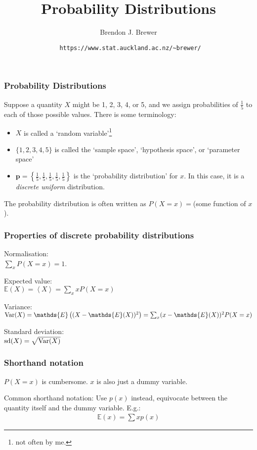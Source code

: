 \documentclass{beamer}
\title{Probability Distributions}
\author{Brendon J. Brewer}
\institute{Department of Statistics\\
The University of Auckland}
\date{{\tt \color{blue} https://www.stat.auckland.ac.nz/\~{ }brewer/}}
\begin{document}
\frame{\titlepage}


\begin{frame}
\frametitle{Probability Distributions}
Suppose a quantity $X$ might be 1, 2, 3, 4, or 5, and we assign probabilities of
$\frac{1}{5}$ to each of those possible values. There is some terminology:

\begin{itemize}
  \item $X$ is called a `random variable'\footnote{not often by me.}
  \item $\{1, 2, 3, 4, 5\}$ is called the `sample space', `hypothesis space',
        or `parameter space'
  \item $\boldsymbol{p} = \left\{\frac{1}{5}, \frac{1}{5}, \frac{1}{5},
                \frac{1}{5}, \frac{1}{5}\right\}$
        is the `probability distribution' for
        $x$. In this case, it is a {\em discrete uniform} distribution.
\end{itemize}

The probability distribution is often written as $P(X=x) = $(some function of $x$).

\end{frame}



\begin{frame}
\frametitle{Properties of discrete probability distributions}

Normalisation:\\ $\sum_x P(X=x) = 1$.\vspace{0.5em}

Expected value:\\$\mathds{E}(X) = \left<X\right> = \sum_x x P(X=x)$\vspace{0.5em}

Variance:\\$\textnormal{Var}(X) = \mathds{E}\left((X - \mathds{E}(X))^2\right) = \sum_x (x - \mathds{E}(X))^2 P(X=x)$\vspace{0.5em}

Standard deviation:\\$\textnormal{sd}(X) = \sqrt{\textnormal{Var}(X)}$

\end{frame}


\begin{frame}
\frametitle{Shorthand notation}
$P(X=x)$ is cumbersome. $x$ is also just a dummy variable.

Common shorthand notation: 
Use $p(x)$ instead, equivocate between the quantity itself and the dummy
variable. E.g.:
\begin{align}
\mathds{E}(x) = \sum x p(x)
\end{align}

\end{frame}
\end{document}
